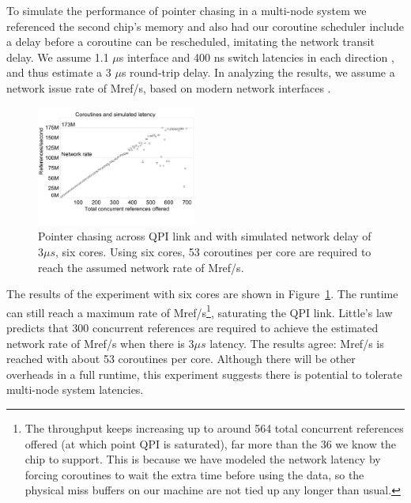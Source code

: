 \documentclass[10pt,nocopyrightspace]{sigplanconf}
\newcommand{\mrps}[1]{\unit[#1]{Mref/s}}
\begin{document}
To simulate the performance of pointer chasing in a multi-node system
we referenced the second chip's memory and also had our coroutine scheduler include a delay
before a coroutine can be rescheduled, imitating the network transit
delay. We assume 1.1 $\mu$s interface and 400 ns switch latencies in each direction
\cite{infiniband, mellanox:site}, and thus estimate a 3 $\mu$s round-trip
delay. In analyzing the results, we assume a network issue rate of \mrps{100}, based on modern network interfaces \cite{mellanox:press}.

\begin{figure}[h]
  \begin{center}
    \includegraphics[width=0.47\textwidth]{figures/delay7800-remote-edited.pdf}
  \end{center}
  \vspace{-0.3in}
  \caption{Pointer chasing across QPI link and with simulated network delay of $3\mu s$, six cores. Using six cores, 53 coroutines per core are required to reach the assumed network rate of \mrps{100}.}
  \label{fig:network-delay}
\end{figure}

The results of the experiment with six cores are shown in
Figure~\ref{fig:network-delay}. The runtime can still reach a
maximum rate of \mrps{173}\footnote{The throughput keeps increasing up to around 564 total concurrent references offered (at which point QPI is saturated), far more than the 36 we know the chip to support. This is because we have modeled the network latency by forcing coroutines to wait the extra time before using the data, so the physical miss buffers on our machine are not tied up any longer than usual.}, saturating the QPI link.  Little's law predicts that 300 concurrent references are required to achieve the estimated network rate of \mrps{100} when there is $3\mu s$ latency. The results agree: \mrps{100} is reached with about 53 coroutines per core. Although there will be other overheads in a full runtime, this experiment suggests there is potential to tolerate multi-node system latencies.
\end{document}
